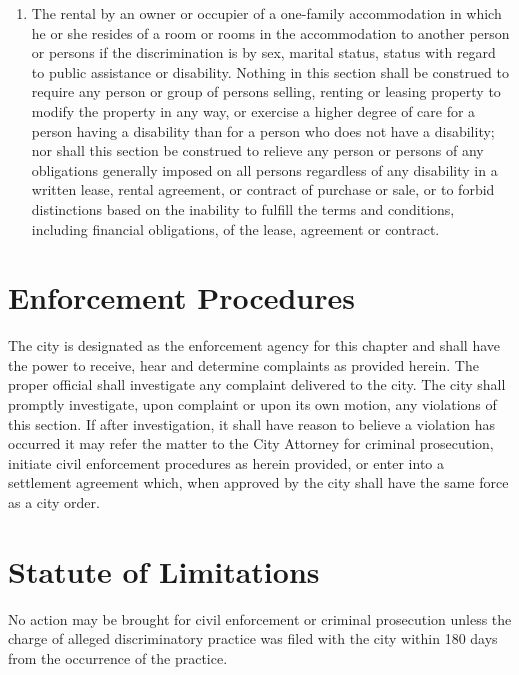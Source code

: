 \begin{enumerate}[{\indent}A)]
\begin{enumerate}
        \item The rental by an owner or occupier of a one-family accommodation in which he or she resides of a room or rooms in the accommodation to another person or persons if the discrimination is by sex, marital status, status with regard to public assistance or disability. Nothing in this section shall be construed to require any person or group of persons selling, renting or leasing property to modify the property in any way, or exercise a higher degree of care for a person having a disability than for a person who does not have a disability; nor shall this section be construed to relieve any person or persons of any obligations generally imposed on all persons regardless of any disability in a written lease, rental agreement, or contract of purchase or sale, or to forbid distinctions based on the inability to fulfill the terms and conditions, including financial obligations, of the lease, agreement or contract.
    \end{enumerate}
\end{enumerate}

\section{Enforcement Procedures}
The city is designated as the enforcement agency for this chapter and shall have the power to receive, hear and determine complaints as provided herein. The proper official shall investigate any complaint delivered to the city. The city shall promptly investigate, upon complaint or upon its own motion, any violations of this section.  If after investigation, it shall have reason to believe a violation has occurred it may refer the matter to the City Attorney for criminal prosecution, initiate civil enforcement procedures as herein provided, or enter into a settlement agreement which, when approved by the city shall have the same force as a city order.

\section{Statute of Limitations}
No action may be brought for civil enforcement or criminal prosecution unless the charge of alleged discriminatory practice was filed with the city within 180 days from the occurrence of the practice.

